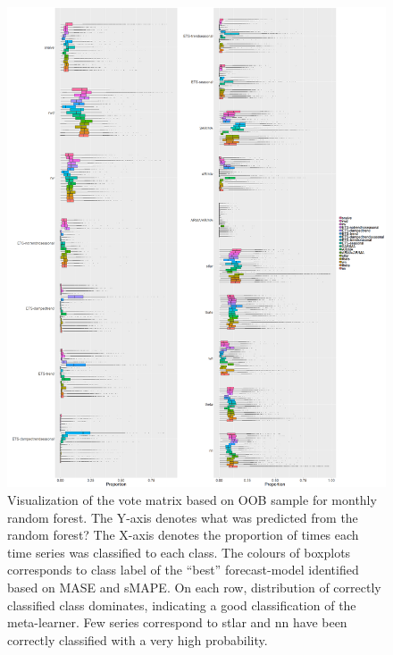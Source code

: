 \documentclass[11pt,a4paper,]{article}
\begin{document}
\clearpage

\begin{figure}
\centering
\includegraphics{figures/oobquarterlymonthly2-1.png}
\caption{\label{fig:oobquarterlymonthly2} Visualization of the vote matrix
based on OOB sample for monthly random forest. The Y-axis denotes what
was predicted from the random forest? The X-axis denotes the proportion
of times each time series was classified to each class. The colours of
boxplots corresponds to class label of the ``best'' forecast-model
identified based on MASE and sMAPE. On each row, distribution of
correctly classified class dominates, indicating a good classification
of the meta-learner. Few series correspond to stlar and nn have been
correctly classified with a very high probability.}
\end{figure}

\clearpage
\end{document}
